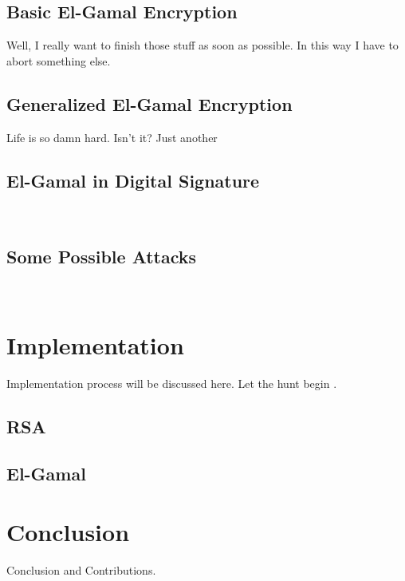\documentclass[12pt,journal,compsoc]{IEEEtran}
\begin{document}



\subsection{Basic El-Gamal Encryption}
Well, I really want to finish those stuff as soon as possible. In this
way I have to abort something else.

\subsection{Generalized El-Gamal Encryption}
Life is so damn hard. Isn't it? Just another 

\subsection{El-Gamal in Digital Signature}
~

\subsection{Some Possible Attacks}
~





\section{Implementation}
\label{sec:implementation}


Implementation process will be discussed here. Let the hunt begin \cite{ref:Elgamal1985}.

\subsection{RSA}

\subsection{El-Gamal}


\section{Conclusion}
Conclusion and Contributions.
\end{document}
